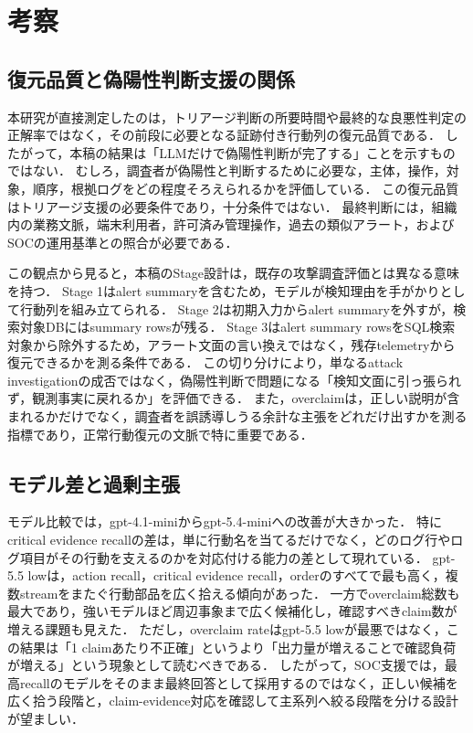 \documentclass[a4paper,twocolumn,10pt]{article}
\newcommand{\code}[1]{{\small\ttfamily #1}}
\begin{document}
\section{考察}

\subsection{復元品質と偽陽性判断支援の関係}

本研究が直接測定したのは，トリアージ判断の所要時間や最終的な良悪性判定の正解率ではなく，その前段に必要となる証跡付き行動列の復元品質である．
したがって，本稿の結果は「LLMだけで偽陽性判断が完了する」ことを示すものではない．
むしろ，調査者が偽陽性と判断するために必要な，主体，操作，対象，順序，根拠ログをどの程度そろえられるかを評価している．
この復元品質はトリアージ支援の必要条件であり，十分条件ではない．
最終判断には，組織内の業務文脈，端末利用者，許可済み管理操作，過去の類似アラート，およびSOCの運用基準との照合が必要である．

この観点から見ると，本稿のStage設計は，既存の攻撃調査評価とは異なる意味を持つ．
Stage 1はalert summaryを含むため，モデルが検知理由を手がかりとして行動列を組み立てられる．
Stage 2は初期入力からalert summaryを外すが，検索対象DBにはsummary rowsが残る．
Stage 3はalert summary rowsをSQL検索対象から除外するため，アラート文面の言い換えではなく，残存telemetryから復元できるかを測る条件である．
この切り分けにより，単なるattack investigationの成否ではなく，偽陽性判断で問題になる「検知文面に引っ張られず，観測事実に戻れるか」を評価できる．
また，overclaimは，正しい説明が含まれるかだけでなく，調査者を誤誘導しうる余計な主張をどれだけ出すかを測る指標であり，正常行動復元の文脈で特に重要である．

\subsection{モデル差と過剰主張}

モデル比較では，\code{gpt-4.1-mini}から\code{gpt-5.4-mini}への改善が大きかった．
特にcritical evidence recallの差は，単に行動名を当てるだけでなく，どのログ行やログ項目がその行動を支えるのかを対応付ける能力の差として現れている．
\code{gpt-5.5 low}は，action recall，critical evidence recall，orderのすべてで最も高く，複数streamをまたぐ行動部品を広く拾える傾向があった．
一方でoverclaim総数も最大であり，強いモデルほど周辺事象まで広く候補化し，確認すべきclaim数が増える課題も見えた．
ただし，overclaim rateは\code{gpt-5.5 low}が最悪ではなく，この結果は「1 claimあたり不正確」というより「出力量が増えることで確認負荷が増える」という現象として読むべきである．
したがって，SOC支援では，最高recallのモデルをそのまま最終回答として採用するのではなく，正しい候補を広く拾う段階と，claim-evidence対応を確認して主系列へ絞る段階を分ける設計が望ましい．
\end{document}
